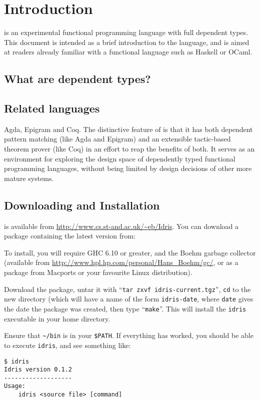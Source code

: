 \section{Introduction}

\Idris{} is an experimental functional programming language with full
dependent types. This document is intended as a brief introduction to
the language, and is aimed at readers already familiar with a
functional language such as Haskell or OCaml.

\subsection{What are dependent types?}

\subsection{Related languages}

Agda, Epigram and Coq. The distinctive feature of \Idris{} is that it
has both dependent pattern matching (like Agda and Epigram) and an
extensible tactic-based theorem prover (like Coq) in an effort to reap
the benefits of both. It serves as an environment for exploring the
design space of dependently typed functional programming languages,
without being limited by design decisions of other more mature
systems.

\subsection{Downloading and Installation}

\Idris{} is available from \url{http://www.cs.st-and.ac.uk/~eb/Idris}.
You can download a package containing the latest version from:


To install, you will require GHC 6.10 or greater, and the Boehm
garbage collector (available from
\url{http://www.hpl.hp.com/personal/Hans_Boehm/gc/}, or as a package
from Macports or your favourite Linux distribution).

Download the package, untar it with ``\texttt{tar zxvf
  idris-current.tgz}'', \texttt{cd} to the new directory (which will
have a name of the form \texttt{idris-date}, where \texttt{date} gives
the date the package was created, then type ``\texttt{make}''. This
will install the \texttt{idris} executable in your home
directory. 

Ensure that \texttt{\~{ }/bin} is in your \texttt{\$PATH}. If
everything has worked, you should be able to execute \texttt{idris},
and see something like:

\begin{verbatim}
$ idris
Idris version 0.1.2
-------------------
Usage:
	idris <source file> [command]
\end{verbatim}


